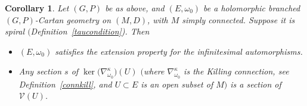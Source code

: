 \documentclass[10pt,a4paper]{amsart}
\numberwithin{equation}{section}
\newtheorem{Corollary}[Theorem]{Corollary}
\begin{document}
\begin{Corollary}\label{proprextaffine} Let $(G,P)$ be as above, and $(E,\omega_0)$ be a holomorphic branched $(G,P)$-Cartan geometry on $(M,D)$, with $M$ simply connected. Suppose it is spiral $($Definition~{\rm \ref{taucondition})}. Then
\begin{itemize}\itemsep=0pt
\item[$(1)$] $(E,\omega_0)$ satisfies the extension property for the infinitesimal automorphisms.
\item[$(2)$] Any section $s$ of $\ker\big(\nabla^\kappa_{\omega_0}\big)(U)$ $($where $\nabla^\kappa_{\omega_0}$ is the Killing connection, see Definition~{\rm \ref{connkill}}, and $U\subset E$ is an open subset of $M)$ is a section of $\mathcal{V}(U)$.
\end{itemize}\end{Corollary}
\end{document}
